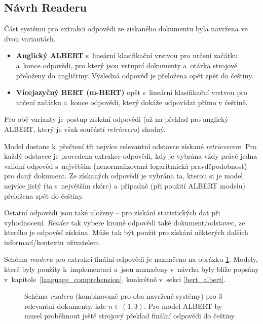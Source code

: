 \subsection{Návrh Readeru}
Část systému pro extrakci odpovědi ze získaného dokumentu byla navržena ve dvou variantách.
\begin{itemize}
    \item \textbf{Anglický ALBERT} s~lineární klasifikační vrstvou pro určení začátku a~konce odpovědi, pro který jsou vstupní dokumenty a~otázka strojově přeloženy do angličtiny. Výsledná odpověď je přeložena opět zpět do češtiny.
    \item \textbf{Vícejazyčný BERT (m-BERT)} opět s~lineární klasifikační vrstvou pro určení začátku a~konce odpovědi, který dokáže odpovídat přímo v češtině.
\end{itemize}
Pro obě varianty je postup získání odpovědi (až na překlad pro anglický ALBERT, který je však součástí \emph{retrieveru}) shodný.\par
Model dostane k~přečtení tři nejvíce relevantní odstavce získané \emph{retrieverem}. Pro každý odstavec je provedena extrakce odpovědi, kdy je vybrána vždy právě jedna validní odpověď s~největším  (nenormalizovaná logaritmická pravděpodobnost) pro daný dokument. Ze získaných odpovědí je vybrána ta, kterou si je model nejvíce jistý (ta s~největším skóre) a~případně (při použití ALBERT modelu) přeložena zpět do češtiny.\par
\noindent Ostatní odpovědi jsou také uloženy -- pro získání statistických dat při vyhodnocení. \emph{Reader} tak vybere kromě odpovědi také dokument/odstavec, ze kterého je odpověď získána. Může tak být použit pro získání některých dalších informací/kontextu uživatelem.\par
Schéma \emph{readeru} pro extrakci finální odpovědi je naznačeno na obrázku \ref{reader_schema}. Modely, které byly použity k~implementaci a~jsou naznačeny v~návrhu byly blíže popsány v~kapitole~\ref{language_comprehension}, konkrétně v~sekci \ref{bert_albert}.

\begin{figure}[hbt]
	\centering
	\caption{Schéma \emph{readeru} (kombinovaně pro oba navržené systémy) pro 3 relevantní dokumenty, kde $n \in (1,3)$. Pro model ALBERT by musel proběhnout ještě strojový překlad finální odpovědi do češtiny.}
	\label{reader_schema}
\end{figure}

